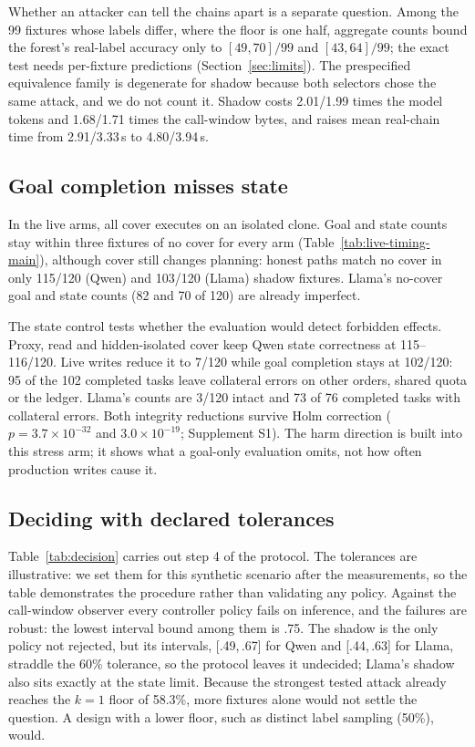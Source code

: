 Whether an attacker can tell the chains apart is a separate question. Among the 99 fixtures whose labels differ, where the floor is one half, aggregate counts bound the forest's real-label accuracy only to $[49,70]/99$ and $[43,64]/99$; the exact test needs per-fixture predictions (Section~\ref{sec:limits}). The prespecified equivalence family is degenerate for shadow because both selectors chose the same attack, and we do not count it. Shadow costs 2.01/1.99 times the model tokens and 1.68/1.71 times the call-window bytes, and raises mean real-chain time from 2.91/3.33\,s to 4.80/3.94\,s.

\subsection{Goal completion misses state}\label{sec:state}
In the live arms, all cover executes on an isolated clone. Goal and state counts stay within three fixtures of no cover for every arm (Table~\ref{tab:live-timing-main}), although cover still changes planning: honest paths match no cover in only 115/120 (Qwen) and 103/120 (Llama) shadow fixtures. Llama's no-cover goal and state counts (82 and 70 of 120) are already imperfect.

The state control tests whether the evaluation would detect forbidden effects. Proxy, read and hidden-isolated cover keep Qwen state correctness at 115--116/120. Live writes reduce it to 7/120 while goal completion stays at 102/120: 95 of the 102 completed tasks leave collateral errors on other orders, shared quota or the ledger. Llama's counts are 3/120 intact and 73 of 76 completed tasks with collateral errors. Both integrity reductions survive Holm correction ($p=3.7\times10^{-32}$ and $3.0\times10^{-19}$; Supplement S1). The harm direction is built into this stress arm; it shows what a goal-only evaluation omits, not how often production writes cause it.

\subsection{Deciding with declared tolerances}\label{sec:decision}
Table~\ref{tab:decision} carries out step 4 of the protocol. The tolerances are illustrative: we set them for this synthetic scenario after the measurements, so the table demonstrates the procedure rather than validating any policy. Against the call-window observer every controller policy fails on inference, and the failures are robust: the lowest interval bound among them is .75. The shadow is the only policy not rejected, but its intervals, [.49,\,.67] for Qwen and [.44,\,.63] for Llama, straddle the 60\% tolerance, so the protocol leaves it undecided; Llama's shadow also sits exactly at the state limit. Because the strongest tested attack already reaches the $k=1$ floor of 58.3\%, more fixtures alone would not settle the question. A design with a lower floor, such as distinct label sampling (50\%), would.

